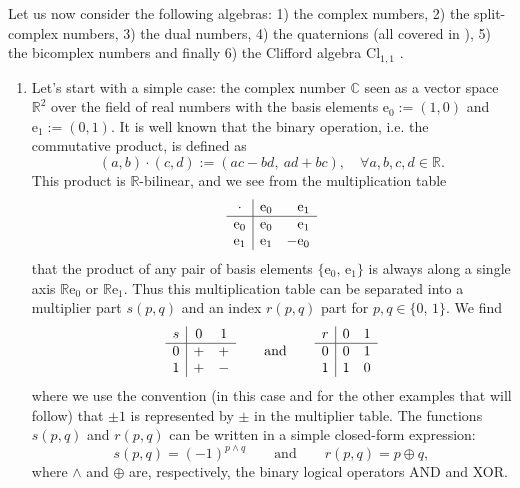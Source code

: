 \documentclass{article}
\begin{document}
Let us now consider the following algebras:
1) the complex numbers, 2) the split-complex numbers, 3) the dual numbers, 4) the quaternions (all covered in \cite{Kantor}), 5) the bicomplex numbers \cite{GBPrice} and finally 6) the Clifford algebra $\mathrm{Cl}_{1,1}$ \cite{Lounesto_2001}. 

\begin{enumerate}
    
\item Let's start with a simple case: the complex number $\mathbb{C}$ seen as a vector space $\mathbb{R}^2$ over the field of real numbers with the basis elements $\mathrm e_0 := (1,0)$ and $\mathrm e_1 := (0,1)$. It is well known \cite{Kantor} that the binary operation, i.e. the commutative product, is defined as
$$ (a,b) \cdot (c,d) := (ac - bd,\ ad + bc), \quad \forall a,b,c,d \in \mathbb{R}. $$
This product is $\mathbb{R}$-bilinear, and we see from the multiplication table
$$ \begin{array}{c | r r}
     \cdot & \mathrm e_0 & \mathrm e_1\\
     \hline
     \mathrm e_0 & \mathrm e_0 & \mathrm e_1 \\
     \mathrm e_1 & \mathrm e_1 & -\mathrm e_0 \\
\end{array} $$
that the product of any pair of basis elements $\{\mathrm e_0,\,\mathrm e_1\}$ is always along a single axis $\mathbb{R}  \mathrm e_0$ or $\mathbb{R} \mathrm e_1$. Thus this multiplication table can be separated into a multiplier part $s(p,q)$ and an index $r(p,q)$ part for $p,q \in \{0,\, 1\}$. We find
$$ \begin{array}{c | c c}
     s & 0 & 1\\
     \hline
     0 & + & + \\
     1 & + & - \\
\end{array} \qquad \text{and} \qquad \begin{array}{c | c c}
     r & 0 & 1\\
     \hline
     0 & 0 & 1 \\
     1 & 1 & 0 \\
\end{array} $$
where we use the convention (in this case and for the other examples that will follow) that $\pm 1$ is represented by $\pm$ in the multiplier table. The functions $s(p,q)$ and $r(p,q)$ can be written in a simple closed-form expression:
$$ s(p,q) = (-1)^{p \wedge q} \qquad \text{and}\qquad r(p,q) = p \oplus q, $$
where $\wedge$ and $\oplus$ are, respectively, the binary logical operators AND and XOR. 


\end{enumerate}
\end{document}
